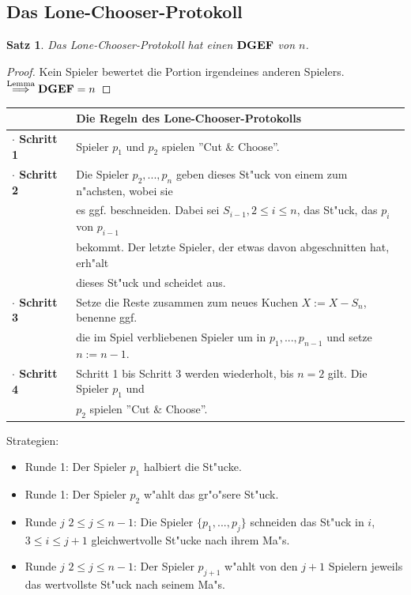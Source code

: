 \documentclass[11pt, a4paper, twoside]{article}
\newtheorem*{satz}{Satz}
\newcommand{\DGEF}{\text{\textbf{DGEF}}}
\numberwithin{equation}{section}
\begin{document}
\subsection{Das Lone-Chooser-Protokoll}
%
\begin{satz}
 Das Lone-Chooser-Protokoll hat einen $\DGEF$ von $n$.
\end{satz}
\begin{proof}
 Kein Spieler bewertet die Portion irgendeines anderen Spielers.\\$\stackrel{\text{Lemma}}{\Longrightarrow}\DGEF=n$
\end{proof}
\begin{tabular*}{\textwidth}[]{|ll|}
\hline
&\textbf{Die Regeln des Lone-Chooser-Protokolls}\\
\hline
\textbf{$\cdot$ Schritt 1}& Spieler $p_1$ und $p_2$ spielen ''Cut $\&$ Choose''.\\
\textbf{$\cdot$ Schritt 2}& Die Spieler $p_2,...,p_n$ geben dieses St"uck von einem zum n"achsten, wobei sie\\&es ggf. beschneiden. Dabei sei $S_{i-1}, 2 \leq i \leq n$, das St"uck, das $p_i$ von $p_{i-1}$\\&bekommt. Der letzte Spieler, der etwas davon abgeschnitten hat, erh"alt\\&dieses St"uck und scheidet aus.\\
\textbf{$\cdot$ Schritt 3}& Setze die Reste zusammen zum neues Kuchen $X:=X-S_n$, benenne ggf.\\&die im Spiel verbliebenen Spieler um in $p_1,...,p_{n-1}$ und setze $n:=n-1$. \\
\textbf{$\cdot$ Schritt 4}& Schritt 1 bis Schritt 3 werden wiederholt, bis $n=2$ gilt. Die Spieler $p_1$ und\\&$p_2$ spielen ''Cut $\&$ Choose''.\\
\hline
\end{tabular*}
\newline
Strategien:\\
\begin{itemize}
\item Runde 1: Der Spieler $p_1$ halbiert die St"ucke.
\item Runde 1: Der Spieler $p_2$ w"ahlt das gr"o"sere St"uck.
\item Runde $j$ $2 \leq j \leq n-1$: Die Spieler $\{p_1,...,p_j\}$ schneiden das St"uck in $i$, $3 \leq i \leq j+1$ gleichwertvolle St"ucke nach ihrem Ma"s.
\item Runde $j$ $2 \leq j \leq n-1$: Der Spieler $p_{j+1}$ w"ahlt von den $j+1$ Spielern jeweils das wertvollste St"uck nach seinem Ma"s.
\end{itemize}
\end{document}
